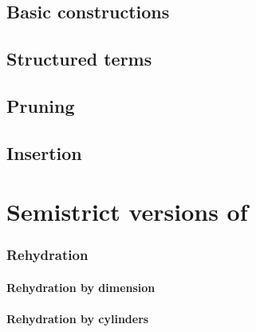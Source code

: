 \documentclass{cam-thesis}
\begin{document}
\section{Basic constructions}
\label{sec:basic-constructions}

\section{Structured terms}
\label{sec:structured-terms}

\section{Pruning}
\label{sec:pruning}

\section{Insertion}
\label{sec:insertion}

\chapter{Semistrict versions of \Catt}
\label{cha:cattsu}

\subsection{\Cattsu}
\label{sec:cattsu}

\subsection{\Cattsua}
\label{sec:cattsua}

\subsection{Rehydration}
\label{sec:rehydration}




\subsubsection{Rehydration by dimension}
\label{sec:rehydr-dimens}

\subsubsection{Rehydration by cylinders}
\label{sec:rehydr-cylind}



















\printbibliography
\end{document}
